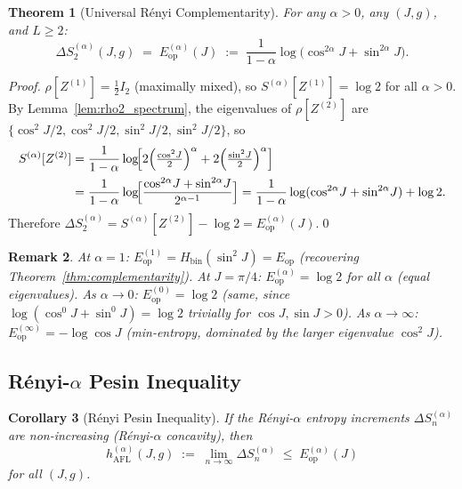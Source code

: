 \documentclass[12pt,a4paper]{article}
\newtheorem{theorem}{Theorem}[section]
\newtheorem{corollary}[theorem]{Corollary}
\newtheorem{remark}[theorem]{Remark}
\begin{document}
\begin{theorem}[Universal Rényi Complementarity]\label{thm:renyi_comp}
For any $\alpha>0$, any $(J,g)$, and $L\ge 2$:
\begin{equation}\label{eq:renyi_comp}
  \boxed{\Delta S^{(\alpha)}_2(J,g)
  \;=\; E^{(\alpha)}_\mathrm{op}(J)
  \;:=\; \frac{1}{1-\alpha}\log\!\bigl(\cos^{2\alpha}\!J + \sin^{2\alpha}\!J\bigr).}
\end{equation}
\end{theorem}

\begin{proof}
$\rho[Z^{(1)}] = \tfrac{1}{2}I_2$ (maximally mixed), so
$S^{(\alpha)}[Z^{(1)}] = \log 2$ for all $\alpha > 0$.
By Lemma~\ref{lem:rho2_spectrum}, the eigenvalues of $\rho[Z^{(2)}]$ are
$\{\cos^2\!J/2,\cos^2\!J/2,\sin^2\!J/2,\sin^2\!J/2\}$, so
\begin{align}
  S^{(\alpha)}[Z^{(2)}]
  &= \frac{1}{1-\alpha}\log\!\Bigl[2\Bigl(\tfrac{\cos^2\!J}{2}\Bigr)^\alpha
    + 2\Bigl(\tfrac{\sin^2\!J}{2}\Bigr)^\alpha\Bigr] \notag\\
  &= \frac{1}{1-\alpha}\log\!\Bigl[\frac{\cos^{2\alpha}\!J + \sin^{2\alpha}\!J}{2^{\alpha-1}}\Bigr]
  = \frac{1}{1-\alpha}\log(\cos^{2\alpha}\!J+\sin^{2\alpha}\!J) + \log 2.
\end{align}
Therefore $\Delta S^{(\alpha)}_2 = S^{(\alpha)}[Z^{(2)}] - \log 2 = E^{(\alpha)}_\mathrm{op}(J)$.\qed
\end{proof}

\begin{remark}
At $\alpha=1$: $E^{(1)}_\mathrm{op} = H_\mathrm{bin}(\sin^2\!J) = E_\mathrm{op}$ (recovering
Theorem~\ref{thm:complementarity}).
At $J=\pi/4$: $E^{(\alpha)}_\mathrm{op} = \log 2$ for all $\alpha$ (equal eigenvalues).
As $\alpha\to 0$: $E^{(0)}_\mathrm{op} = \log 2$ (same, since $\log(\cos^0\!J+\sin^0\!J) = \log 2$ trivially for $\cos J,\sin J > 0$).
As $\alpha\to\infty$: $E^{(\infty)}_\mathrm{op} = -\log\cos J$ (min-entropy, dominated by the larger eigenvalue $\cos^2\!J$).
\end{remark}

\subsection{Rényi-$\alpha$ Pesin Inequality}

\begin{corollary}[Rényi Pesin Inequality]\label{cor:renyi_pesin}
If the Rényi-$\alpha$ entropy increments $\Delta S^{(\alpha)}_n$ are non-increasing
(Rényi-$\alpha$ concavity), then
\[
  h^{(\alpha)}_\mathrm{AFL}(J,g) \;:=\; \lim_{n\to\infty}\Delta S^{(\alpha)}_n
  \;\le\; E^{(\alpha)}_\mathrm{op}(J)
\]
for all $(J,g)$.
\end{corollary}
\end{document}
